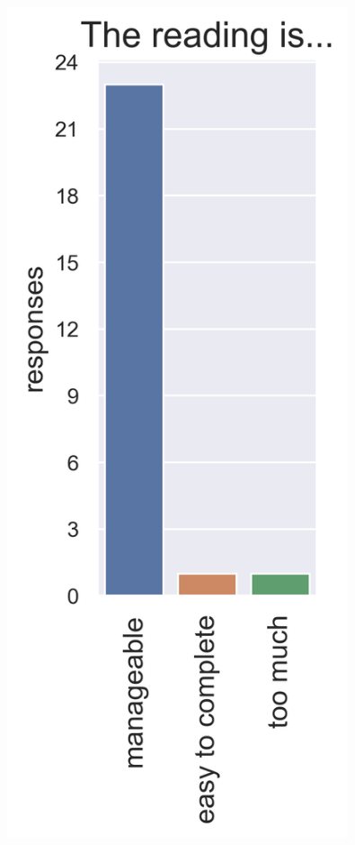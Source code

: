 \documentclass[aspectratio=169, handout]{beamer}
\begin{document}
\begin{frame}[t]
\begin{columns}
\begin{figure}
\includegraphics[width=0.9\textwidth]{survey_readings}
\caption*{}
\end{figure}

\end{columns}
\end{frame}
\end{document}
